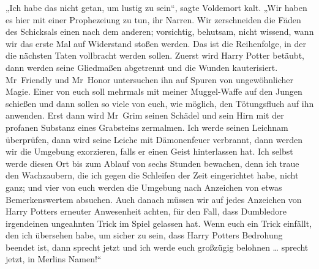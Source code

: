 „Ich habe das nicht getan, um lustig zu sein“, sagte Voldemort kalt.
„Wir haben es hier mit einer Prophezeiung zu tun, ihr Narren. Wir zerschneiden die Fäden des Schicksals einen nach dem anderen; vorsichtig, behutsam, nicht wissend, wann wir das erste Mal auf Widerstand stoßen werden. Das ist die Reihenfolge, in der die nächsten Taten vollbracht werden sollen. Zuerst wird Harry Potter betäubt, dann werden seine Gliedmaßen abgetrennt und die Wunden kauterisiert. Mr~Friendly und Mr~Honor untersuchen ihn auf Spuren von ungewöhnlicher Magie. Einer von euch soll mehrmals mit meiner Muggel-Waffe auf den Jungen schießen und dann sollen so viele von euch, wie möglich, den Tötungsfluch auf ihn anwenden. Erst dann wird Mr~Grim seinen Schädel und sein Hirn mit der profanen Substanz eines Grabsteins zermalmen. Ich werde seinen Leichnam überprüfen, dann wird seine Leiche mit Dämonenfeuer verbrannt, dann werden wir die Umgebung exorzieren, falls er einen Geist hinterlassen hat. Ich selbst werde diesen Ort bis zum Ablauf von sechs Stunden bewachen, denn ich traue den Wachzaubern, die ich gegen die Schleifen der Zeit eingerichtet habe, nicht ganz; und vier von euch werden die Umgebung nach Anzeichen von etwas Bemerkenswertem absuchen. Auch danach müssen wir auf jedes Anzeichen von Harry Potters erneuter Anwesenheit achten, für den Fall, dass Dumbledore irgendeinen ungeahnten Trick im Spiel gelassen hat. Wenn euch ein Trick einfällt, den ich übersehen habe, um sicher zu sein, dass Harry Potters Bedrohung beendet ist, dann sprecht jetzt und ich werde euch großzügig belohnen … sprecht jetzt, in Merlins Namen!“

